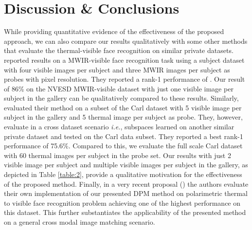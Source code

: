 \documentclass[smallextended,natbib]{svjour3}       \usepackage{graphicx}
\newcommand{\ie}{\emph{i.e.}}
\begin{document}
\section{Discussion \& Conclusions}
\label{Disc}
While providing quantitative evidence of the effectiveness of the proposed approach, we can also compare our results qualitatively with some other methods that evaluate the thermal-visible face recognition on similar private datasets. \citep{bourlai2012} reported results on a MWIR-visible face recognition task using a  subject dataset with four visible images per subject and three MWIR images per subject as probes with  pixel resolution. They reported a rank-1 performance of . Our result of 86\% on the NVESD MWIR-visible dataset with just one visible image per subject in the gallery can be qualitatively compared to these results. Similarly, \cite{Chen2015} evaluated their method on a subset of the Carl dataset with 5 visible image per subject in the gallery and 5 thermal image per subject as probe. They, however, evaluate in a cross dataset scenario \ie, subspaces learned on another similar private dataset and tested on the Carl data subset. They reported a best rank-1 performance of 75.6\%. Compared to this, we evaluate the full scale Carl dataset with 60 thermal images per subject in the probe set. Our results with just 2 visible image per subject and multiple visible images per subject in the gallery, as depicted in Table \ref{table:2}, provide a qualitative motivation for the effectiveness of the proposed method. Finally, in a very recent proposal (\cite{Riggen2016}) the authors evaluate their own implementation of our presented DPM method on polarimetric thermal to visible face recognition problem achieving one of the highest performance on this dataset. This further substantiates the applicability of the presented method on a general cross modal image matching scenario. 
\end{document}
